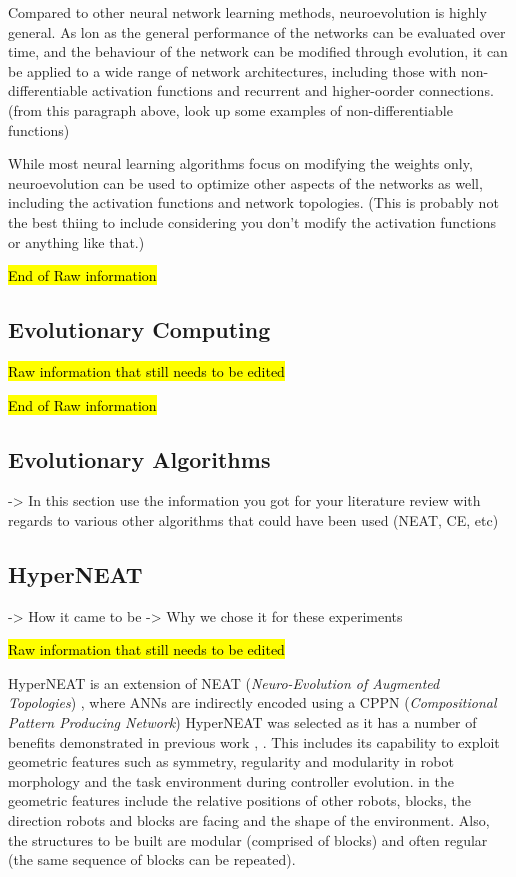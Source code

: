 \documentclass[conference]{IEEEtran}
\begin{document}
Compared to other neural network learning methods, neuroevolution is highly general. As lon as the general performance of the networks can be evaluated over time, and the behaviour of the network can be modified through evolution, it can be applied to a wide range of network architectures, including those with non-differentiable activation functions and recurrent and higher-oorder connections.
(from this paragraph above, look up some examples of non-differentiable functions)

While most neural learning algorithms focus on modifying the weights only, neuroevolution can be used to optimize other aspects of the networks as well, including the activation functions and network topologies.
(This is probably not the best thiing to include considering you don't modify the activation functions or anything like that.)




\hl{End of Raw information}

\subsection{Evolutionary Computing}

\hl{Raw information that still needs to be edited}

\hl{End of Raw information}

\subsection{Evolutionary Algorithms}
-> In this section use the information you got for your literature review with regards to various other algorithms that could have been used (NEAT, CE, etc)


\subsection{HyperNEAT}
-> How it came to be
-> Why we chose it for these experiments

\hl{Raw information that still needs to be edited}

HyperNEAT \cite{StanleyDAmbrosioGauci2009} is an extension of NEAT (\textit{Neuro-Evolution of Augmented Topologies})
\cite{StanleyMiikkulainen2002}, where ANNs are indirectly encoded using a CPPN (\textit{Compositional Pattern Producing Network})
\cite{Stanley2007}
HyperNEAT was selected as it has a number of benefits demonstrated in previous work \cite{DAmbrosio2013},
\cite{WatsonNitschke2015SSCI}.
This includes its capability to exploit geometric features such as symmetry, regularity and modularity
in robot morphology and the task environment during controller evolution.
in the  geometric features include the relative positions of other robots, blocks,
the direction robots and blocks are facing and the shape of the environment.
Also, the structures to be built are modular
(comprised of blocks) and often regular (the same sequence of blocks can be repeated).
\end{document}
